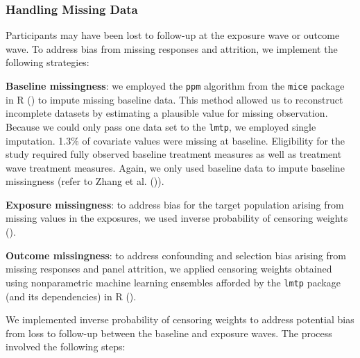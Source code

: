 \documentclass[
  single column]{article}
\begin{document}
\newpage{}

\subsubsection{Handling Missing Data}\label{handling-missing-data}

Participants may have been lost to follow-up at the exposure wave or
outcome wave. To address bias from missing responses and attrition, we
implement the following strategies:

\textbf{Baseline missingness}: we employed the \texttt{ppm} algorithm
from the \texttt{mice} package in R () to impute missing baseline data. This method allowed us
to reconstruct incomplete datasets by estimating a plausible value for
missing observation. Because we could only pass one data set to the
\texttt{lmtp}, we employed single imputation. 1.3\% of covariate values
were missing at baseline. Eligibility for the study required fully
observed baseline treatment measures as well as treatment wave treatment
measures. Again, we only used baseline data to impute baseline
missingness (refer to Zhang et al.
()).

\textbf{Exposure missingness}: to address bias for the target population
arising from missing values in the exposures, we used inverse
probability of censoring weights ().

\textbf{Outcome missingness}: to address confounding and selection bias
arising from missing responses and panel attrition, we applied censoring
weights obtained using nonparametric machine learning ensembles afforded
by the \texttt{lmtp} package (and its dependencies) in R
().

We implemented inverse probability of censoring weights to address
potential bias from loss to follow-up between the baseline and exposure
waves. The process involved the following steps:
\end{document}
